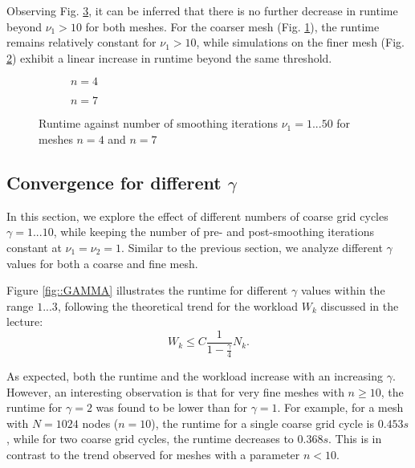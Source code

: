 \documentclass[11pt,a4paper]{article}
\newcommand{\refFig}[1]{Fig. \ref{#1}}
\begin{document}
Observing \refFig{fig::TimNu}, it can be inferred that there is no further decrease in runtime beyond $\nu_1 > 10$ for both meshes. For the coarser mesh (\refFig{fig::TimNu1}), the runtime remains relatively constant for $\nu_1 > 10$, while simulations on the finer mesh (\refFig{fig::TimNu2}) exhibit a linear increase in runtime beyond the same threshold.
%
\begin{figure}[h!]
	\centering
	\begin{subfigure}[h!]{.49\textwidth}
		\begin{center}
			\resizebox{0.52\width}{!}{}
			\caption{$n=4$}
			\label{fig::TimNu1}
		\end{center}	
	\end{subfigure}
	\hfill
	\begin{subfigure}[h!]{.49\textwidth}
		\centering
		\resizebox{0.52\width}{!}{}
		\caption{$n=7$}
		\label{fig::TimNu2}
	\end{subfigure}
	\caption{Runtime against number of smoothing iterations $\nu_1 = 1...50 $ for meshes $n=4$ and $n=7$ }
	\label{fig::TimNu}
\end{figure}


\subsection{Convergence for different $\gamma$}

In this section, we explore the effect of different numbers of coarse grid cycles $\gamma = 1...10$, while keeping the number of pre- and post-smoothing iterations constant at $\nu_1 = \nu_2 = 1$. Similar to the previous section, we analyze different $\gamma$ values for both a coarse and fine mesh.

Figure \ref{fig::GAMMA} illustrates the runtime for different $\gamma$ values within the range $1...3$, following the theoretical trend for the workload $W_k$ discussed in the lecture:
\begin{equation}
	W_k \leq C \frac{1}{1 - \frac{\gamma}{4}} N_k.
\end{equation}

As expected, both the runtime and the workload increase with an increasing $\gamma$. However, an interesting observation is that for very fine meshes with $n \geq 10$, the runtime for $\gamma = 2$ was found to be lower than for $\gamma = 1$. For example, for a mesh with $N = 1024$ nodes ($n=10$), the runtime for a single coarse grid cycle is $0.453 s$, while for two coarse grid cycles, the runtime decreases to $0.368 s$. This is in contrast to the trend observed for meshes with a parameter $n < 10$.
\end{document}
